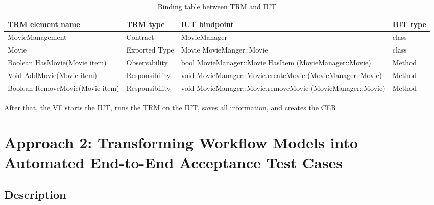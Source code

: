 \begin{table}[h] 
	\centering
	\begin{small}
		\caption{Binding table between TRM and IUT}
		\label{tab:bindingTable}
		\setlength{\tabcolsep}{1em}
		\begin{tabular}{>{\raggedright}p{3.5cm}| p{1.75cm}|>{\raggedright}p{5.8cm} |p{0.75cm} }
			\hline
			\textbf{TRM element name} & \textbf{TRM type} & \textbf{IUT bindpoint} & \textbf{IUT type} \\
			\hline	
			MovieManagement & Contract & MovieManager & class\\
			\hline
			Movie & Exported Type & Movie MovieManger::Movie & class \\
			\hline
			Boolean HasMovie(Movie item) & Observability & bool MovieManager::Movie.HasItem (MovieManager::Movie) & Method \\
			\hline
			Void AddMovie(Movie item) & Responsibility & void  MovieManager::Movie.createMovie (MovieManager::Movie) & Method \\
			\hline
			Boolean RemoveMovie(Movie item) & Responsibility & void MovieManager::Movie.removeMovie (MovieManager::Movie) & Method \\
			\hline
		\end{tabular}
	\end{small}
\end{table}

After that, the VF starts the IUT, runs the TRM on the IUT, saves all information, and creates the CER.
\section{Approach 2: Transforming Workflow Models into Automated End-to-End Acceptance Test Cases}
\label{topic08:sectionApproach2}

\subsection{Description}
\label{topic08:sectionApproach2Description}

